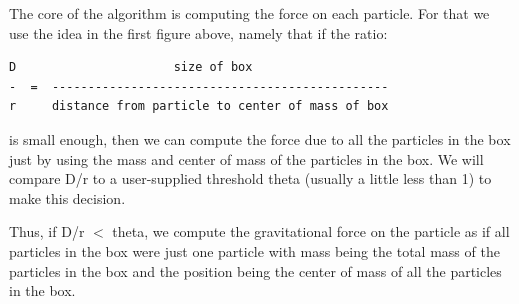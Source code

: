 The core of the algorithm is computing the force on each particle. For that we use the
idea in the first figure above, namely that if the ratio:

\begin{verbatim}
D                      size of box
-  =  -----------------------------------------------
r     distance from particle to center of mass of box
\end{verbatim}

is small enough, then we can compute the force due to all the particles in the
box just by using the mass and center of mass of the particles in the box. We
will compare D/r to a user-supplied threshold theta (usually a little less than
1) to make this decision.

Thus, if D/r $<$ theta, we compute the gravitational force on the particle as if
all particles in the box were just one particle with mass being the total mass of
the particles in the box and the position being the center of mass of all the
particles in the box.





